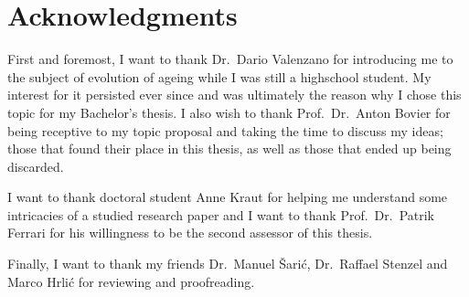\documentclass[11pt, a4paper]{article}
\theoremstyle{definition}
\begin{document}
\section{Acknowledgments}
    First and foremost, I want to thank Dr.\ Dario Valenzano for introducing me to the subject of evolution of ageing while I was still a highschool student. My interest for it persisted ever since and was ultimately the reason why I chose this topic for my Bachelor's thesis. I also wish to thank Prof.\ Dr.\ Anton Bovier for being receptive to my topic proposal and taking the time to discuss my ideas; those that found their place in this thesis, as well as those that ended up being discarded.

    I want to thank doctoral student Anne Kraut for helping me understand some intricacies of a studied research paper and I want to thank Prof.\ Dr.\ Patrik Ferrari for his willingness to be the second assessor of this thesis.

    Finally, I want to thank my friends Dr.\ Manuel \v{S}ari\'{c}, Dr.\ Raffael Stenzel and Marco Hrli\'{c} for reviewing and proofreading.

\printbibliography[title={References}]
\end{document}
